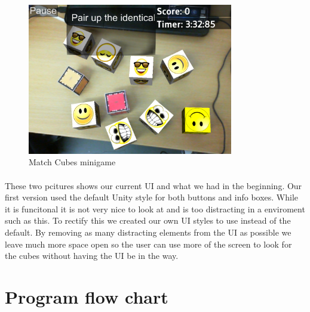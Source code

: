 \begin{figure}[ht]
	\capstart
	\centering
	\includegraphics[width=0.8\textwidth]{images/MatchCubes}
	\caption{Match Cubes minigame}
	\label{fig:match_cubes}
\end{figure}

\paragraph{}
These two pcitures shows our current UI and what we had in the beginning.
Our first version used the default Unity style for both buttons and info boxes.
While it is funcitonal it is not very nice to look at and is too distracting in a enviroment such as this.
To rectify this we created our own UI styles to use instead of the default.
By removing as many distracting elements from the UI as possible we leave much more space open so the user can use more of the
screen to look for the cubes without having the UI be in the way.



\newpage
\section{Program flow chart}

